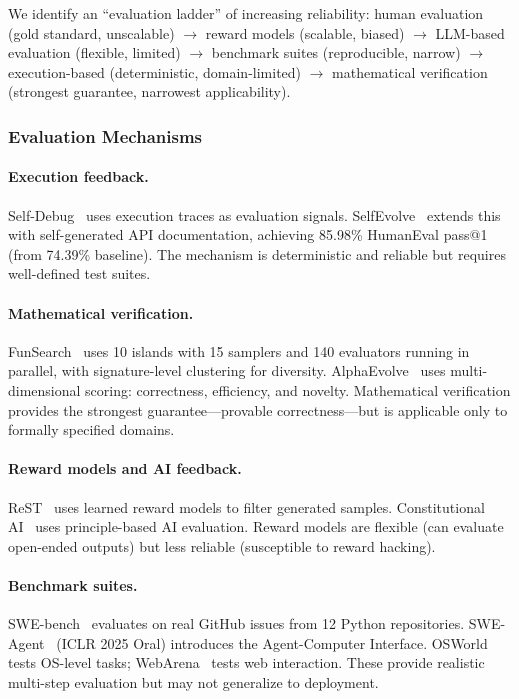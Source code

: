 We identify an ``evaluation ladder'' of increasing reliability: human evaluation (gold standard, unscalable) $\rightarrow$ reward models (scalable, biased) $\rightarrow$ LLM-based evaluation (flexible, limited) $\rightarrow$ benchmark suites (reproducible, narrow) $\rightarrow$ execution-based (deterministic, domain-limited) $\rightarrow$ mathematical verification (strongest guarantee, narrowest applicability).

\subsubsection{Evaluation Mechanisms}

\paragraph{Execution feedback.}
Self-Debug~\citep{chen2024selfdebug} uses execution traces as evaluation signals. SelfEvolve~\citep{jiang2024selfevolve} extends this with self-generated API documentation, achieving 85.98\% HumanEval pass@1 (from 74.39\% baseline). The mechanism is deterministic and reliable but requires well-defined test suites.

\paragraph{Mathematical verification.}
FunSearch~\citep{romera2024funsearch} uses 10 islands with 15 samplers and 140 evaluators running in parallel, with signature-level clustering for diversity. AlphaEvolve~\citep{novikov2025alphaevolve} uses multi-dimensional scoring: correctness, efficiency, and novelty. Mathematical verification provides the strongest guarantee---provable correctness---but is applicable only to formally specified domains.

\paragraph{Reward models and AI feedback.}
ReST~\citep{gulcehre2023rest} uses learned reward models to filter generated samples. Constitutional AI~\citep{bai2022constitutional} uses principle-based AI evaluation. Reward models are flexible (can evaluate open-ended outputs) but less reliable (susceptible to reward hacking).

\paragraph{Benchmark suites.}
SWE-bench~\citep{jimenez2024swebench} evaluates on real GitHub issues from 12 Python repositories. SWE-Agent~\citep{yang2024sweagent} (ICLR 2025 Oral) introduces the Agent-Computer Interface. OSWorld~\citep{xie2024osworld} tests OS-level tasks; WebArena~\citep{zhou2024webarena} tests web interaction. These provide realistic multi-step evaluation but may not generalize to deployment.

